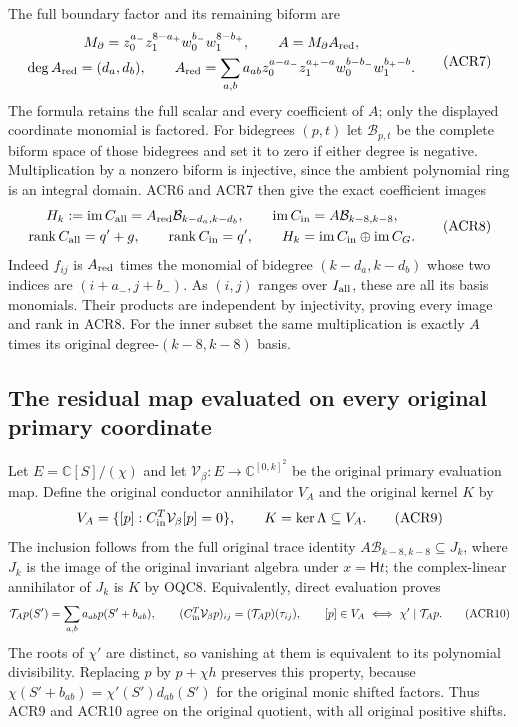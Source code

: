 \documentclass[11pt,a4paper]{article}
\begin{document}
The full boundary factor and its remaining biform are
\[
 \begin{gathered}
 M_\partial=z_0^{a_-}z_1^{8-a_+}w_0^{b_-}w_1^{8-b_+},
 \qquad A=M_\partial A_{\rm red},\\
 \deg A_{\rm red}=(d_a,d_b),\qquad
 A_{\rm red}=\sum_{a,b}a_{ab}
       z_0^{a-a_-}z_1^{a_+-a}w_0^{b-b_-}w_1^{b_+-b}.
 \end{gathered}\tag{ACR7}
\]
The formula retains the full scalar and every coefficient of
$A$; only the displayed coordinate monomial is factored.
For bidegrees $(p,t)$ let $\mathcal B_{p,t}$ be the complete
biform space of those bidegrees and set it to zero if either
degree is negative. Multiplication by a nonzero biform is
injective, since the ambient polynomial ring is an integral
domain. ACR6 and ACR7 then give the exact coefficient images
\[
 \begin{gathered}
 H_k:=\operatorname{im}C_{\rm all}
       =A_{\rm red}\mathcal B_{k-d_a,k-d_b},\qquad
 \operatorname{im}C_{\rm in}=A\mathcal B_{k-8,k-8},\\
 \operatorname{rank}C_{\rm all}=q'+g,
 \qquad \operatorname{rank}C_{\rm in}=q',\qquad
 H_k=\operatorname{im}C_{\rm in}\oplus\operatorname{im}C_G.
 \end{gathered}\tag{ACR8}
\]
Indeed $f_{ij}$ is $A_{\rm red}$ times the monomial of
bidegree $(k-d_a,k-d_b)$ whose two indices are
$(i+a_-,j+b_-)$. As $(i,j)$ ranges over $I_{\rm all}$,
these are all its basis monomials. Their products are
independent by injectivity, proving every image and rank
in ACR8. For the inner subset the same multiplication is
exactly $A$ times its original degree-$(k-8,k-8)$ basis.

\subsection{The residual map evaluated on every original primary coordinate}

Let $E=\mathbb C[S]/(\chi)$ and let
$\mathcal V_\beta:E\to\mathbb C^{[0,k]^2}$ be the original
primary evaluation map. Define the original conductor
annihilator $V_A$ and the original kernel $K$ by
\[
 V_A=\{[p]:C_{\rm in}^T\mathcal V_\beta[p]=0\},
 \qquad K=\ker\Lambda\subseteq V_A.
 \tag{ACR9}
\]
The inclusion follows from the full original trace identity
$A\mathcal B_{k-8,k-8}\subseteq J_k$, where $J_k$ is the
image of the original invariant algebra under $x=\mathsf Ht$;
the complex-linear annihilator of $J_k$ is $K$ by OQC8.
Equivalently, direct evaluation proves
\[
 \mathcal T_Ap(S')=\sum_{a,b}a_{ab}p(S'+b_{ab}),\qquad
 (C_{\rm in}^T\mathcal V_\beta p)_{ij}
                 =(\mathcal T_Ap)(\tau_{ij}),\qquad
 [p]\in V_A\ \Longleftrightarrow\ \chi'\mid\mathcal T_Ap.
 \tag{ACR10}
\]
The roots of $\chi'$ are distinct, so vanishing at them is
equivalent to its polynomial divisibility. Replacing $p$ by
$p+\chi h$ preserves this property, because
$\chi(S'+b_{ab})=\chi'(S')d_{ab}(S')$ for the original
monic shifted factors. Thus ACR9 and ACR10 agree on the
original quotient, with all original positive shifts.
\end{document}
